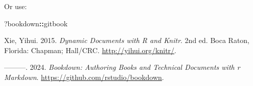 \documentclass[
]{book}
\newenvironment{Shaded}{\begin{snugshade}}{\end{snugshade}}
\newcommand{\NormalTok}[1]{#1}
\newcommand{\SpecialCharTok}[1]{\textcolor[rgb]{0.81,0.36,0.00}{\textbf{#1}}}
\newlength{\cslhangindent}
\newlength{\cslentryspacingunit} %
\newenvironment{CSLReferences}[2] %
 {%
  \setlength{\parindent}{0pt}
  \ifodd #1
  \let\oldpar\par
  \def\par{\hangindent=\cslhangindent\oldpar}
  \fi
  \setlength{\parskip}{#2\cslentryspacingunit}
 }%
 {}
\begin{document}
Or use:

\begin{Shaded}
\begin{Highlighting}[]
\NormalTok{?bookdown}\SpecialCharTok{::}\NormalTok{gitbook}
\end{Highlighting}
\end{Shaded}

\hypertarget{refs}{}
\begin{CSLReferences}{1}{0}
\leavevmode{}%
Xie, Yihui. 2015. \emph{Dynamic Documents with {R} and Knitr}. 2nd ed.
Boca Raton, Florida: Chapman; Hall/CRC. \url{http://yihui.org/knitr/}.

\leavevmode{}%
---------. 2024. \emph{Bookdown: Authoring Books and Technical Documents
with r Markdown}. \url{https://github.com/rstudio/bookdown}.

\end{CSLReferences}

\backmatter
\end{document}
